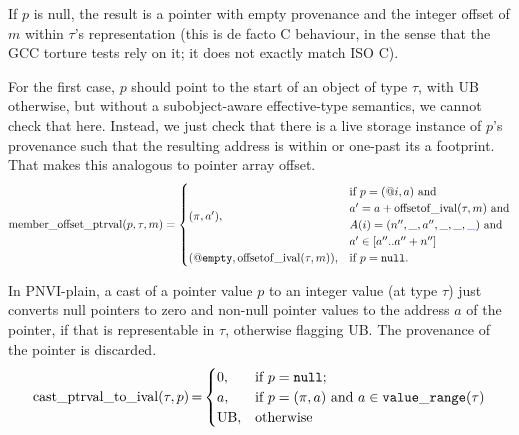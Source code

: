\documentclass[acmsmall,review,screen]{acmart}\settopmatter{printfolios=true,printccs=false,printacmref=false}
\makeatletter
\newcommand{\myparagraph}[1]{\vspace{0.5\baselineskip}\par\noindent{\normalsize\bfseries{#1}}\quad}
\DeclareMathOperator{\intcastPtr}{cast\_ptrval\_to\_ival} %
\DeclareMathOperator{\offsetofIval}{offsetof\_ival}
\DeclareMathOperator{\memberOffset}{member\_offset\_ptrval}
\newcommand{\Null}{\mathtt{null}} %
\newcommand{\provNone}{@\mathtt{empty}}
\makeatother
\begin{document}
If $p$ is null, the result is a pointer with empty provenance and the
        integer offset of $m$ within $\tau$'s representation
        (this is de facto C behaviour, in the sense that the GCC torture tests rely
        on it; it does not exactly match ISO C).

For the first case, 
$p$ should point to the start of an object of type $\tau$, with UB
otherwise, but without a
subobject-aware effective-type semantics, we cannot check that
here.  Instead, we just check that there is a live storage instance of
$p$'s provenance such that the resulting address is within or one-past
its 
a footprint. That makes this analogous to pointer
array offset. 
\[
    \memberOffset(p, \tau, m) =
    \begin{cases}
      (\pi, a'),
& \begin{array}{@{}l@{}}
\text{if } p = (@i, a)   \text{ and}\\
a'=a + \offsetofIval(\tau, m) \text{ and}\\
A(i) = (n'', \_, a'', \_, \_, \myt{\_}) \text{ and}\\
a'\in [a''..a''+n'']
\end{array}\\
      (\provNone,\offsetofIval(\tau, m)),
        &\text{if $p = \Null$.}
    \end{cases}
\]



%
%

\myparagraph{Casts (PNVI-plain)}
In PNVI-plain, a cast of a pointer value $p$  to an integer value (at type $\tau$)
just converts null pointers to zero and non-null pointer values to the
address $a$ of the pointer, if that is representable in $\tau$,
otherwise flagging UB.  The provenance of the pointer is discarded. 
\[ \begin{array}{@{}r@{\,}c@{\,}l@{}}
\intcastPtr(\tau, p) &=&
    \begin{cases}
       0,
        &\text{if } p = \Null; \\
       a,
        &\text{if } p = (\pi, a) \text{ and } a \in \mathtt{value\_range}(\tau) \\
      \text{UB},
        &\text{otherwise}
    \end{cases}
\end{array}
\]
\end{document}
